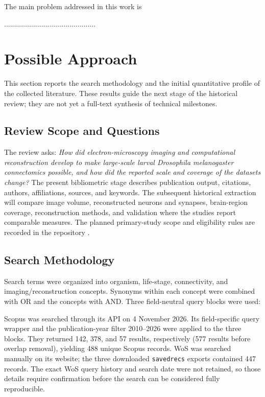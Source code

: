 \documentclass[conference]{IEEEtran}
\begin{document}
The main problem addressed in this work is 

..............................................

\section{Possible Approach}

This section reports the search methodology and the initial quantitative
profile of the collected literature. These results guide the next stage of
the historical review; they are not yet a full-text synthesis of technical
milestones.

\subsection{Review Scope and Questions}

The review asks: \textit{How did electron-microscopy imaging and
computational reconstruction develop to make large-scale larval
\textit{Drosophila melanogaster} connectomics possible, and how did the
reported scale and coverage of the datasets change?} The present
bibliometric stage describes publication output, citations, authors,
affiliations, sources, and keywords. The subsequent historical extraction
will compare image volume, reconstructed neurons and synapses, brain-region
coverage, reconstruction methods, and validation where the studies report
comparable measures. The planned primary-study scope and eligibility rules
are recorded in the repository \cite{repo}.

\subsection{Search Methodology}

Search terms were organized into organism, life-stage, connectivity, and
imaging/reconstruction concepts. Synonyms within each concept were combined
with OR and the concepts with AND. Three field-neutral query blocks were
used:



Scopus was searched through its API on 4 November 2026. Its field-specific
query wrapper and the publication-year filter 2010--2026 were applied to the
three blocks. They returned 142, 378, and 57 results, respectively (577
results before overlap removal), yielding 488 unique Scopus records. WoS was
searched manually on its website; the three downloaded \texttt{savedrecs}
exports contained 447 records. The exact WoS query history and search date
were not retained, so those details require confirmation before the search
can be considered fully reproducible.
\end{document}
